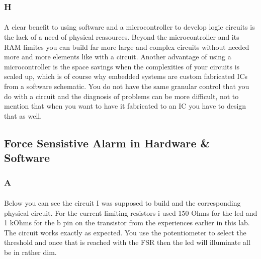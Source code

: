 \documentclass[12pt]{article}
\begin{document}
			\subsubsection{H}
				\paragraph{}
					A clear benefit to using software and a microcontroller to develop logic circuits is the lack of a need of physical reasources.  Beyond the microcontroller
					and its RAM limites you can build far more large and complex circuits without needed more and more elements like with a circuit.  Another advantage of 
					using a microcontroller is the space savings when the complexities of your circuits is scaled up, which is of course why embedded systems are custom
					fabricated ICs from a software schematic.  You do not have the same granular control that you do with a circuit and the diagnosis of problems can be
					more difficult, not to mention that when you want to have it fabricated to an IC you have to design that as well.

		\subsection{Force Sensistive Alarm in Hardware \& Software}
			\subsubsection{A}
				\paragraph{}
					Below you can see the circuit I was supposed to build and the corresponding physical circuit.  For the current limiting resistors i used 150 Ohms
					for the led and 1 kOhms for the b pin on the transistor from the experiences earlier in this lab.  The circuit works exactly as expected.  You use the 
					potentiometer to select the threshold and once that is reached with the FSR then the led will illuminate all be in rather dim.  
\end{document}
